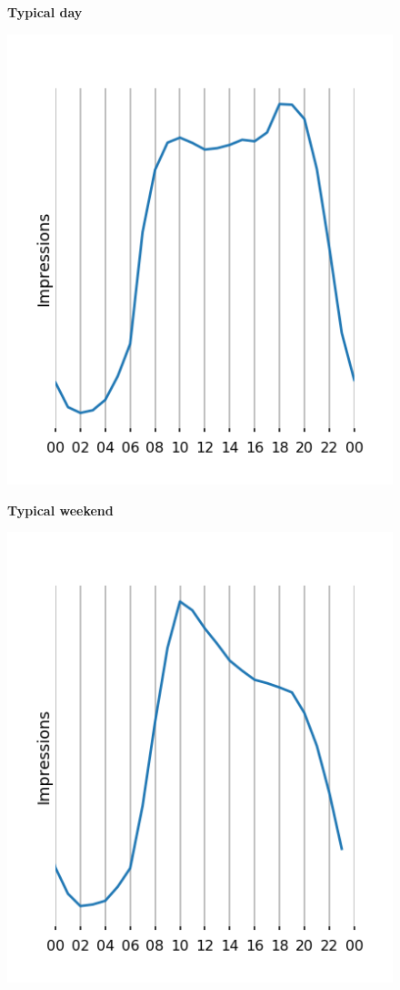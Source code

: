 \documentclass[intlimits, 9pt, unicode]{beamer}
\begin{document}
\begin{frame}
\begin{figure}
\textbf{Typical day}\par\medskip
\includegraphics[scale=0.10]{images/examples_day}
\end{figure}

\begin{figure}
\textbf{Typical weekend}\par\medskip
\includegraphics[scale=0.10]{images/examples_weekend}
\end{figure}

\end{frame}
\end{document}
